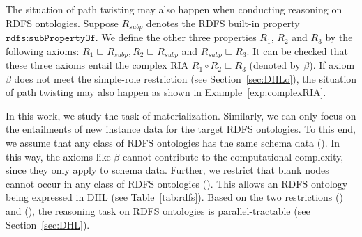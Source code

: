 The situation of path twisting may also happen when conducting reasoning
on RDFS ontologies. Suppose $R_{subp}$ denotes the RDFS built-in property $\texttt{rdfs:subPropertyOf}$.
We define the other three properties $R_1$, $R_2$ and $R_3$ by the following axioms:
$R_1\sqsubseteq R_{subp}, R_2\sqsubseteq R_{subp}$ and $R_{subp}\sqsubseteq R_3$.
It can be checked that these three axioms entail the complex RIA $R_1\circ R_2\sqsubseteq R_3$ (denoted by $\beta$).
If axiom $\beta$ does not meet the simple-role restriction (see Section~\ref{sec:DHLo}),
the situation of path twisting may also happen as shown in Example~\ref{exp:complexRIA}.

In this work, we study the task of materialization. Similarly, we can only focus on
the entailments of new instance data for the target RDFS ontologies. To this end,
we assume that any class of RDFS ontologies has the same schema data (\uppercase\expandafter{}). In this way,
the axioms like $\beta$ cannot contribute to the computational complexity, since they
only apply to schema data. Further, we restrict that blank nodes cannot occur in
any class of RDFS ontologies (\uppercase\expandafter{}). This allows an RDFS ontology
being expressed in DHL (see Table~\ref{tab:rdfs}). Based on the two restrictions (\uppercase\expandafter{})
and (\uppercase\expandafter{}), the reasoning task on RDFS ontologies
is parallel-tractable (see Section~\ref{sec:DHL}).




